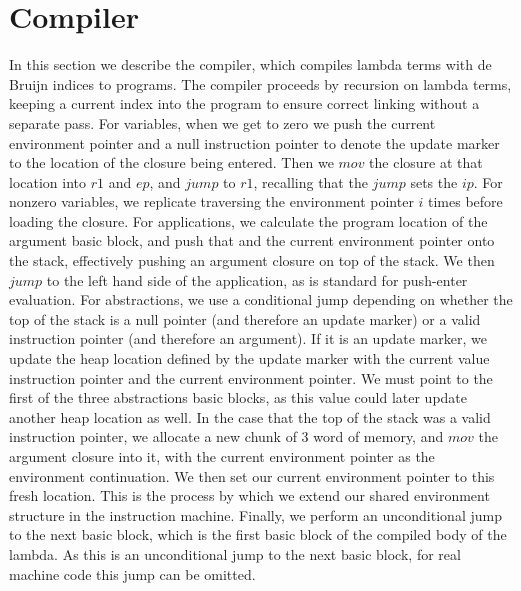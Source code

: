 \section{Compiler} \label{sec:compiler}

In this section we describe the compiler, which compiles lambda terms with
de Bruijn indices to programs. The compiler proceeds by recursion on lambda
terms, keeping a current index into the program to ensure correct linking
without a separate pass. For variables, when we get to zero we push the current
environment pointer and a null instruction pointer to denote the update marker
to the location of the closure being entered. Then we $\mathit{mov}$ the closure
at that location into $r1$ and $ep$, and $\mathit{jump}$ to
$r1$, recalling that the $\mathit{jump}$ sets the $ip$. For 
nonzero variables, we replicate traversing the environment pointer $i$
times before loading the closure.  For applications, we calculate the program
location of the argument basic block, and push that and the current environment
pointer onto the stack, effectively pushing an argument closure on top of the
stack. We then $\mathit{jump}$ to the left hand side of the application, as is
standard for push-enter evaluation. For abstractions, we use a conditional jump
depending on whether the top of the stack is a null pointer (and therefore an
update marker) or a valid instruction pointer (and therefore an argument). If it
is an update marker, we update the heap location defined by the update marker
with the current value instruction pointer and the current environment pointer.
We must point to the first of the three abstractions basic blocks, as this value
could later update another heap location as well. In the case that the top of
the stack was a valid instruction pointer, we allocate a new chunk of 3 word of
memory, and $\mathit{mov}$ the argument closure into it, with the current
environment pointer as the environment continuation. We then set our current
environment pointer to this fresh location. This is the process by which we
extend our shared environment structure in the instruction machine. Finally, we
perform an unconditional jump to the next basic block, which is the first basic
block of the compiled body of the lambda. As this is an unconditional jump to
the next basic block, for real machine code this jump can be omitted. 


